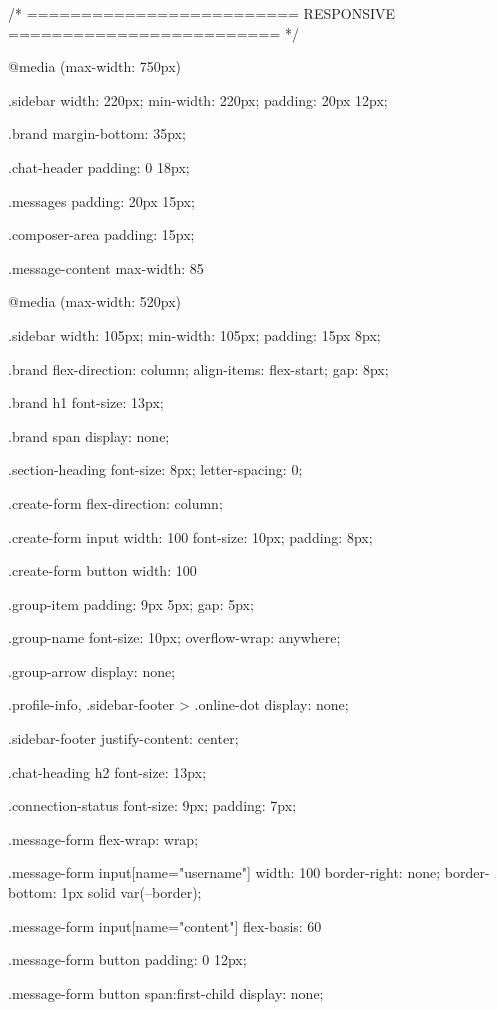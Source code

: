 /* =========================
   RESPONSIVE
========================= */

@media (max-width: 750px) {

    .sidebar {
        width: 220px;
        min-width: 220px;
        padding: 20px 12px;
    }

    .brand {
        margin-bottom: 35px;
    }

    .chat-header {
        padding: 0 18px;
    }

    .messages {
        padding: 20px 15px;
    }

    .composer-area {
        padding: 15px;
    }

    .message-content {
        max-width: 85%
    }
}

@media (max-width: 520px) {

    .sidebar {
        width: 105px;
        min-width: 105px;
        padding: 15px 8px;
    }

    .brand {
        flex-direction: column;
        align-items: flex-start;
        gap: 8px;
    }

    .brand h1 {
        font-size: 13px;
    }

    .brand span {
        display: none;
    }

    .section-heading {
        font-size: 8px;
        letter-spacing: 0;
    }

    .create-form {
        flex-direction: column;
    }

    .create-form input {
        width: 100%
        font-size: 10px;
        padding: 8px;
    }

    .create-form button {
        width: 100%
    }

    .group-item {
        padding: 9px 5px;
        gap: 5px;
    }

    .group-name {
        font-size: 10px;
        overflow-wrap: anywhere;
    }

    .group-arrow {
        display: none;
    }

    .profile-info,
    .sidebar-footer > .online-dot {
        display: none;
    }

    .sidebar-footer {
        justify-content: center;
    }

    .chat-heading h2 {
        font-size: 13px;
    }

    .connection-status {
        font-size: 9px;
        padding: 7px;
    }

    .message-form {
        flex-wrap: wrap;
    }

    .message-form input[name="username"] {
        width: 100%
        border-right: none;
        border-bottom: 1px solid var(--border);
    }

    .message-form input[name="content"] {
        flex-basis: 60%
    }

    .message-form button {
        padding: 0 12px;
    }

    .message-form button span:first-child {
        display: none;
    }
}



